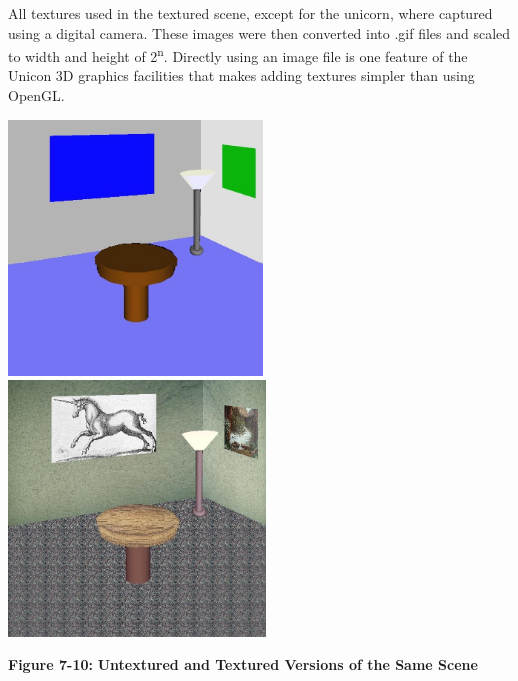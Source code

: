 All textures used in the textured scene, except for the unicorn, where
captured using a digital camera. These images were then converted into
.gif files and scaled to width and height of 2\textsuperscript{n}.
Directly using an image file is one feature of the Unicon 3D graphics
facilities that makes adding textures simpler than using OpenGL. 

\bigskip

{\color{green}
 \includegraphics[width=2.6543in,height=2.6693in]{ub-img/ub-img41.jpg}
\textbf{ \ \ \ \ \ \ \ \ \ \ \ \ \ }
\includegraphics[width=2.6846in,height=2.6693in]{ub-img/ub-img42.jpg} }

{\sffamily\bfseries Figure 7-10:}
{\sffamily\bfseries Untextured and Textured Versions of the Same Scene}

\bigskip

